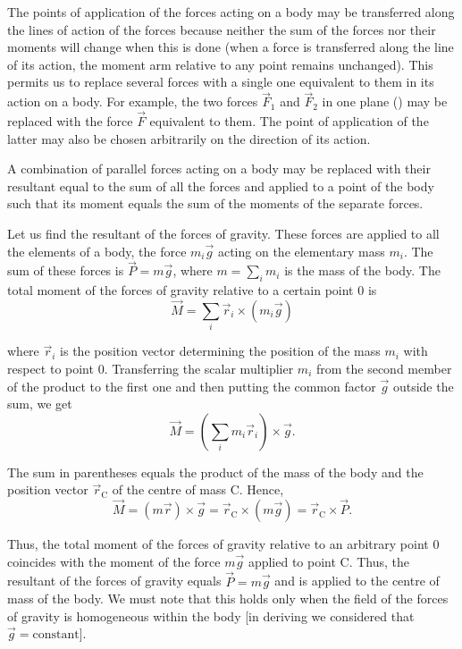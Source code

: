The points of application of the forces acting on a body may be transferred along the lines of action of the forces because neither the sum of the forces nor their moments will change when this is done (when a force is transferred along the line of its action, the moment arm relative to any point remains unchanged). This permits us to replace several forces with a single one equivalent to them in its action on a body. For example, the two forces $\vec{F}_1$ and $\vec{F}_2$ in one plane () may be replaced with the force $\vec{F}$ equivalent to them. The point of application of the latter may also be chosen arbitrarily on the direction of its action.

A combination of parallel forces acting on a body may be replaced with their resultant equal to the sum of all the forces and applied to a point of the body such that its moment equals the sum of the moments of the separate forces.

Let us find the resultant of the forces of gravity. These forces are applied to all the elements of a body, the force $m_i\vec{g}$ acting on the elementary mass $m_i$. The sum of these forces is $\vec{P}=m\vec{g}$, where $m=\sum_im_i$ is the mass of the body. The total moment of the forces of gravity relative to a certain point $0$ is
\begin{equation*}
	\vec{M} = \sum_i \vec{r}_i \times (m_i \vec{g})
\end{equation*}

\noindent
where $\vec{r}_i$ is the position vector determining the position of the mass $m_i$ with respect to point $0$. Transferring the scalar multiplier $m_i$ from the second member of the product to the first one and then putting the common factor $\vec{g}$ outside the sum, we get
\begin{equation*}
	\vec{M} = \left(\sum_i m_i \vec{r}_i\right) \times \vec{g}.
\end{equation*}

\noindent
The sum in parentheses equals the product of the mass of the body and the position vector $\vec{r}_{\text{C}}$ of the centre of mass C. Hence,
\begin{equation}\label{eq:5_56}
	\vec{M} = (m\vec{r})\times\vec{g} = \vec{r}_{\text{C}} \times (m\vec{g}) = \vec{r}_{\text{C}} \times \vec{P}.
\end{equation}

\noindent
Thus, the total moment of the forces of gravity relative to an arbitrary point $0$ coincides with the moment of the force $m\vec{g}$ applied to point C. Thus, the resultant of the forces of gravity equals $\vec{P}=m\vec{g}$ and is applied to the centre of mass of the body. We must note that this holds only when the field of the forces of gravity is homogeneous within the body [in deriving  we considered that $\vec{g}=\text{constant}$].

